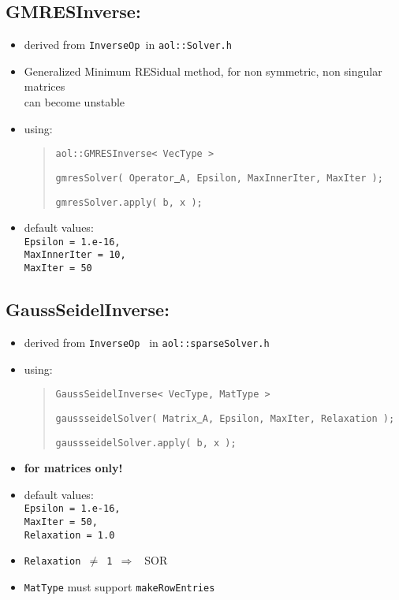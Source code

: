 \subsection{ GMRESInverse: }
\begin{itemize}
\item derived from {\tt InverseOp }in {\tt aol::Solver.h}
\item  Generalized Minimum RESidual method, for non symmetric, non singular matrices\\
can become unstable
\item using: \begin{quote}
{\tt aol::GMRESInverse< VecType > }
\begin{flushright} {\tt  gmresSolver( Operator\underline{ }A, Epsilon, MaxInnerIter, MaxIter );} \end{flushright}
{\tt gmresSolver.apply( b, x );}
\end{quote}
\item default values: \\
{\tt Epsilon = 1.e-16, \\ MaxInnerIter = 10, \\ MaxIter = 50}
\end{itemize}



\subsection{ GaussSeidelInverse: }
\begin{itemize}
\item derived from {\tt InverseOp } in {\tt aol::sparseSolver.h}
\item using: \begin{quote}
{\tt GaussSeidelInverse< VecType, MatType > }
\begin{flushright} {\tt gaussseidelSolver( Matrix\underline{ }A, Epsilon, MaxIter, Relaxation  );}
\end{flushright}
{\tt gaussseidelSolver.apply( b, x );}
\end{quote}
\item {\bf for matrices only!}
\item default values: \\
{\tt Epsilon = 1.e-16, \\ MaxIter = 50, \\ Relaxation = 1.0}
\item {\tt Relaxation $\not=$ 1 $\Rightarrow$ } SOR
\item {\tt MatType} must support {\tt makeRowEntries }
\end{itemize}

